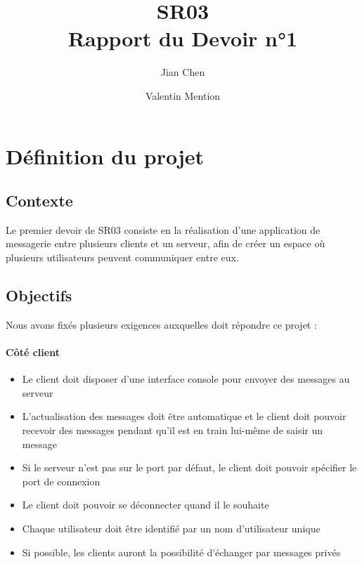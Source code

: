 \documentclass[10pt,a4paper]{article}
\author{
	Jian Chen
	\and
	Valentin Mention
}
\title{SR03\\
	Rapport du Devoir n°1}
\begin{document}
	
	\maketitle
	\newpage
	
	\tableofcontents
	\newpage
	
	\section{Définition du projet}
	\renewcommand{\labelitemi}{-}
	
	\subsection{Contexte}
	Le premier devoir de SR03 consiste en la réalisation d'une application de messagerie entre plusieurs clients et un serveur, afin de créer un espace où plusieurs utilisateurs peuvent communiquer entre eux.
	
	\subsection{Objectifs}
	Nous avons fixés plusieurs exigences auxquelles doit répondre ce projet :
	
	\paragraph{Côté client}
	\begin{itemize}
		\item Le client doit disposer d'une interface console pour envoyer des messages au serveur
		\item L'actualisation des messages doit être automatique et le client doit pouvoir recevoir des messages pendant qu'il est en train lui-même de saisir un message
		\item Si le serveur n'est pas sur le port par défaut, le client doit pouvoir spécifier le port de connexion 
		\item Le client doit pouvoir se déconnecter quand il le souhaite
		\item Chaque utilisateur doit être identifié par un nom d'utilisateur unique
		\item Si possible, les clients auront la possibilité d'échanger par messages privés
	\end{itemize}
\end{document}
